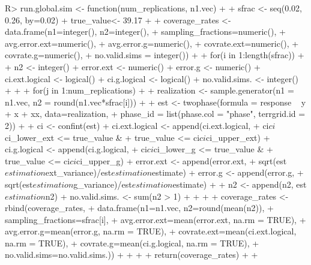 \documentclass[article]{jss}
\begin{document}
\begin{Schunk}
\begin{Sinput}
R> run.global.sim <- function(num_replications, n1.vec){
+  
+    sfrac <- seq(0.02, 0.26, by=0.02) 
+    true_value<- 39.17 
+    
+    coverage_rates <- data.frame(n1=integer(), n2=integer(), 
+                                 sampling_fractions=numeric(), 
+                                 avg.error.ext=numeric(),
+                                 avg.error.g=numeric(),
+                                 covrate.ext=numeric(),
+                                 covrate.g=numeric(),
+                                 no.valid.sims = integer())
+    
+    for(i in 1:length(sfrac)){
+        
+      n2 <- integer()
+      error.ext <- numeric()
+      error.g <- numeric()
+      ci.ext.logical <- logical()
+      ci.g.logical <- logical()
+      no.valid.sims. <- integer()
+        
+        
+      for(j in 1:num_replications){
+          
+        realization <- sample.generator(n1 = n1.vec, n2 = round(n1.vec*sfrac[i]))
+          
+        est <- twophase(formula = response ~ y + x + xx, data=realization,
+                        phase_id = list(phase.col = "phase", terrgrid.id = 2))
+          
+        ci <- confint(est)
+        ci.ext.logical <- append(ci.ext.logical, 
+                                 ci$ci$ci_lower_ext <= true_value & 
+                                 true_value <= ci$ci$ci_upper_ext)
+        ci.g.logical <- append(ci.g.logical, 
+                               ci$ci$ci_lower_g <= true_value & 
+                               true_value <= ci$ci$ci_upper_g)
+        error.ext <- append(error.ext, 
+                            sqrt(est$estimation$ext_variance)/est$estimation$estimate)
+        error.g <- append(error.g, 
+                          sqrt(est$estimation$g_variance)/est$estimation$estimate)
+          
+        n2 <- append(n2, est$estimation$n2)
+        no.valid.sims. <- sum(n2 > 1)
+          
+      }
+      
+      coverage_rates <- rbind(coverage_rates, 
+                              data.frame(n1=n1.vec, n2=round(mean(n2)), 
+                                         sampling_fractions=sfrac[i], 
+                                         avg.error.ext=mean(error.ext, na.rm = TRUE),
+                                         avg.error.g=mean(error.g, na.rm = TRUE),
+                                         covrate.ext=mean(ci.ext.logical, na.rm = TRUE), 
+                                         covrate.g=mean(ci.g.logical, na.rm = TRUE),
+                                         no.valid.sims=no.valid.sims.))
+        
+    } 
+    
+  return(coverage_rates)
+  
+  } 
\end{Sinput}
\end{Schunk}
\end{document}
